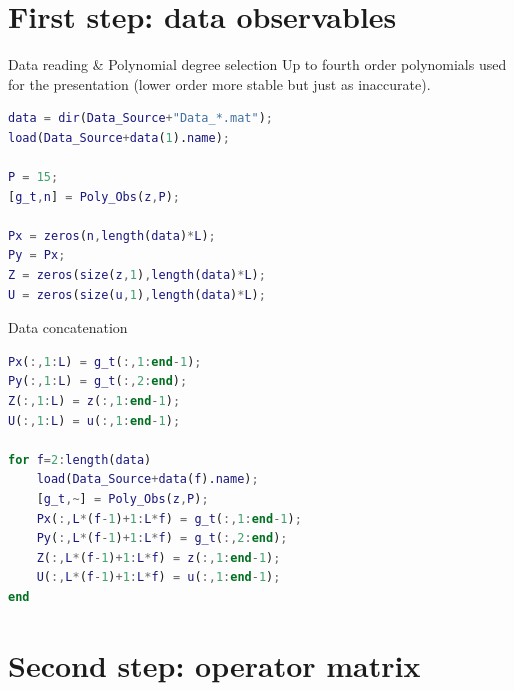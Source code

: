 \documentclass{beamer}
\begin{document}
\section{First step: data observables}

\begin{frame}[fragile]{Data reading \& Polynomial degree selection}
    Up to fourth order polynomials used for the presentation (lower order more stable but just as inaccurate).

    \begin{lstlisting}[language=Matlab]
data = dir(Data_Source+"Data_*.mat");
load(Data_Source+data(1).name);

P = 15;
[g_t,n] = Poly_Obs(z,P);

Px = zeros(n,length(data)*L);
Py = Px;
Z = zeros(size(z,1),length(data)*L);
U = zeros(size(u,1),length(data)*L);
    \end{lstlisting}
\end{frame}

\begin{frame}[fragile]{Data concatenation}
    \begin{lstlisting}[language=Matlab]
Px(:,1:L) = g_t(:,1:end-1);
Py(:,1:L) = g_t(:,2:end);
Z(:,1:L) = z(:,1:end-1);
U(:,1:L) = u(:,1:end-1);

for f=2:length(data)
    load(Data_Source+data(f).name);
    [g_t,~] = Poly_Obs(z,P);
    Px(:,L*(f-1)+1:L*f) = g_t(:,1:end-1);
    Py(:,L*(f-1)+1:L*f) = g_t(:,2:end);
    Z(:,L*(f-1)+1:L*f) = z(:,1:end-1);
    U(:,L*(f-1)+1:L*f) = u(:,1:end-1);
end
    \end{lstlisting}
\end{frame}


\section{Second step: operator matrix}
\end{document}
